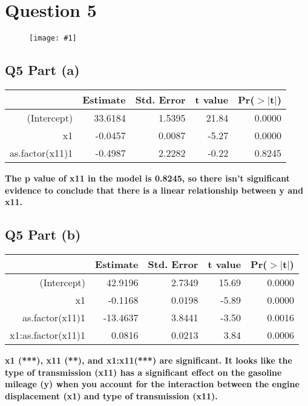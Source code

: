 \documentclass{article}
\newcommand\bsc[2][\DefaultOpt]{%
  \def\DefaultOpt{#2}%
  \section[#1]{#2}%
}
\newcommand\ssc[2][\DefaultOpt]{%
  \def\DefaultOpt{#2}%
  \subsection[#1]{#2}%
}
\newcommand{\wimg}[1]{
\begin{figure}[h]
  \texttt{[image: \#1]}
\end{figure}
}
\begin{document}
\newpage

\bsc{Question 5}{
\wimg{HW6Q5}
\ssc{Q5 Part (a)}{

\begin{table}[ht]
\centering
\begin{tabular}{rrrrr}
  \hline
 & Estimate & Std. Error & t value & Pr($>$$|$t$|$) \\ 
  \hline
(Intercept) & 33.6184 & 1.5395 & 21.84 & 0.0000 \\ 
  x1 & -0.0457 & 0.0087 & -5.27 & 0.0000 \\ 
  as.factor(x11)1 & -0.4987 & 2.2282 & -0.22 & 0.8245 \\ 
   \hline
\end{tabular}
\end{table}

\textbf{The p value of x11 in the model is 0.8245, so there isn't significant evidence to conclude that there is a linear relationship between y and x11.}

}
\ssc{Q5 Part (b)}{

\begin{table}[ht]
\centering
\begin{tabular}{rrrrr}
  \hline
 & Estimate & Std. Error & t value & Pr($>$$|$t$|$) \\ 
  \hline
(Intercept) & 42.9196 & 2.7349 & 15.69 & 0.0000 \\ 
  x1 & -0.1168 & 0.0198 & -5.89 & 0.0000 \\ 
  as.factor(x11)1 & -13.4637 & 3.8441 & -3.50 & 0.0016 \\ 
  x1:as.factor(x11)1 & 0.0816 & 0.0213 & 3.84 & 0.0006 \\ 
   \hline
\end{tabular}
\end{table}

\textbf{x1 (***), x11 (**), and x1:x11(***) are significant. It looks like the type of transmission (x11) has a significant effect on the gasoline mileage (y) when you account for the interaction between the engine displacement (x1) and type of transmission (x11).}

}
}
\end{document}
